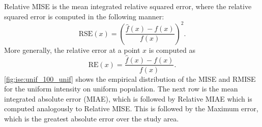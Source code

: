 


Relative MISE is the mean integrated relative squared error, where the relative squared error is computed in the following manner:
\[ \mbox{RSE}(x) = \left(\frac{\hat{f}(x)-f(x)}{f(x)}\right)^2 .\]
More generally, the relative error at a point \(x\) is computed as
\[ \mbox{RE}(x) =  \frac{\hat{f}(x)-f(x)}{f(x)} .\]
\autoref{fig:ise:unif_100_unif} shows the empirical distribution of the MISE and RMISE for the uniform intensity on uniform population.
The next row is the mean integrated absolute error (MIAE), which is followed by Relative MIAE which is computed analogously to Relative MISE.
This is followed by the Maximum error, which is the greatest absolute error over the study area.